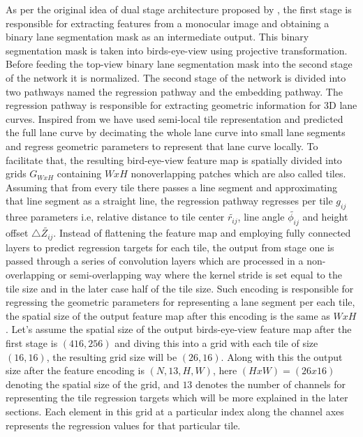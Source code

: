      As per the original idea of dual stage architecture proposed by \cite{guo2020gen}, the first stage is responsible for extracting features from a monocular image and obtaining a binary lane segmentation mask as an intermediate output. This binary segmentation mask is taken into birds-eye-view using projective transformation. Before feeding the top-view binary lane segmentation mask into the second stage of the network it is normalized. The second stage of the network is divided into two pathways named the regression pathway and the embedding pathway. The regression pathway is responsible for extracting geometric information for 3D lane curves. Inspired from \cite{DBLP:journals/corr/abs-2011-01535} we have used semi-local tile representation and predicted the full lane curve by decimating the whole lane curve into small lane segments and regress geometric parameters to represent that lane curve locally. To facilitate that, the resulting bird-eye-view feature map is spatially divided into grids $G_{WxH}$ containing $WxH$ nonoverlapping patches which are also called tiles. Assuming that from every tile there passes a line segment and approximating that line segment as a straight line, the regression pathway regresses per tile $g_{ij}$ three parameters i.e, relative distance to tile center $\widetilde{r_{ij}}$, line angle $\widetilde{\phi_{ij}}$ and height offset $\triangle \widetilde{Z_{ij}}$. Instead of flattening the feature map and employing fully connected layers to predict regression targets for each tile, the output from stage one is passed through a series of convolution layers which are processed in a non-overlapping or semi-overlapping way where the kernel stride is set equal to the tile size and in the later case half of the tile size. Such encoding is responsible for regressing the geometric parameters for representing a lane segment per each tile, the spatial size of the output feature map after this encoding is the same as $WxH$. Let's assume the spatial size of the output birds-eye-view feature map after the first stage is $(416,256)$ and diving this into a grid with each tile of size $(16,16)$, the resulting grid size will be $(26,16)$. Along with this the output size after the feature encoding is $(N, 13, H, W)$, here $(HxW) = (26x16)$ denoting the spatial size of the grid, and $13$ denotes the number of channels for representing the tile regression targets which will be more explained in the later sections. Each element in this grid at a particular index along the channel axes represents the regression values for that particular tile.
     

